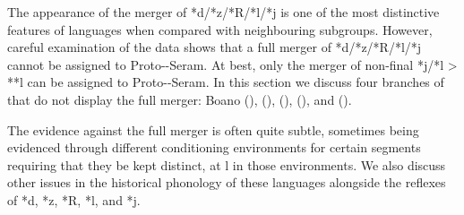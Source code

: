 The appearance of the merger of *d/*z/*R/*l/*j is one of the
most distinctive features of  languages when
compared with neighbouring subgroups.
However, careful examination of the data shows that a full merger
of *d/*z/*R/*l/*j cannot be assigned to Proto--Seram.
At best, only the merger of non-final *j/*l > **l can be assigned to Proto--Seram.
In this section we discuss four branches of 
that do not display the full merger: Boano (),
 (),  (),
 (), and  ().

The evidence against the full merger is often quite subtle,
sometimes being evidenced through different conditioning environments for certain
segments requiring that they be kept distinct,
at l in those environments.
We also discuss other issues in the historical phonology of these
languages alongside the reflexes of *d,
*z, *R, *l, and *j.